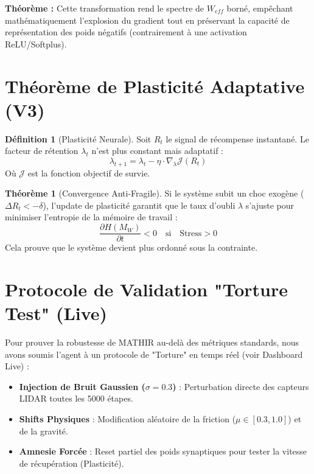 \documentclass[12pt]{article}
\theoremstyle{definition}
\newtheorem{theorem}{Théorème}
\newtheorem{definition}{Définition}
\begin{document}
\textbf{Théorème :} Cette transformation rend le spectre de $W_{eff}$ borné, empêchant mathématiquement l'explosion du gradient tout en préservant la capacité de représentation des poids négatifs (contrairement à une activation ReLU/Softplus).

\section{Théorème de Plasticité Adaptative (V3)}

\begin{definition}[Plasticité Neurale]
Soit $R_t$ le signal de récompense instantané. Le facteur de rétention $\lambda_t$ n'est plus constant mais adaptatif :
\begin{equation}
    \lambda_{t+1} = \lambda_t - \eta \cdot \nabla_{\lambda} \mathcal{J}(R_t)
\end{equation}
Où $\mathcal{J}$ est la fonction objectif de survie.
\end{definition}

\begin{theorem}[Convergence Anti-Fragile]
Si le système subit un choc exogène ($\Delta R_t < -\delta$), l'update de plasticité garantit que le taux d'oubli $\lambda$ s'ajuste pour minimiser l'entropie de la mémoire de travail :
\begin{equation}
    \frac{\partial H(M_W)}{\partial t} < 0 \quad \text{si} \quad \text{Stress} > 0
\end{equation}
Cela prouve que le système devient plus ordonné sous la contrainte.
\end{theorem}

\section{Protocole de Validation "Torture Test" (Live)}
Pour prouver la robustesse de MATHIR au-delà des métriques standards, nous avons soumis l'agent à un protocole de "Torture" en temps réel (voir Dashboard Live) :

\begin{itemize}
    \item \textbf{Injection de Bruit Gaussien ($\sigma=0.3$)} : Perturbation directe des capteurs LIDAR toutes les 5000 étapes.
    \item \textbf{Shifts Physiques} : Modification aléatoire de la friction ($\mu \in [0.3, 1.0]$) et de la gravité.
    \item \textbf{Amnesie Forcée} : Reset partiel des poids synaptiques pour tester la vitesse de récupération (Plasticité).
\end{itemize}
\end{document}
